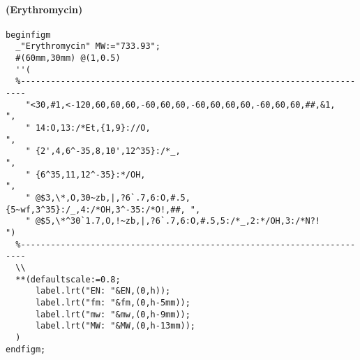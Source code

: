 \documentclass[a4paper]{article}
\begin{document}
\paragraph{(Erythromycin)}
\begin{verbatim}
beginfigm
  _"Erythromycin" MW:="733.93";
  #(60mm,30mm) @(1,0.5)
  ''(
  %-----------------------------------------------------------------------
    "<30,#1,<-120,60,60,60,-60,60,60,-60,60,60,60,-60,60,60,##,&1,        ",
    " 14:O,13:/*Et,{1,9}://O,                                             ",
    " {2',4,6^-35,8,10',12^35}:/*_,                                       ",
    " {6^35,11,12^-35}:*/OH,                                              ",
    " @$3,\*,O,30~zb,|,?6`.7,6:O,#.5,{5~wf,3^35}:/_,4:/*OH,3^-35:/*O!,##, ",
    " @$5,\*^30`1.7,O,!~zb,|,?6`.7,6:O,#.5,5:/*_,2:*/OH,3:/*N?!           ")
  %-----------------------------------------------------------------------
  \\
  **(defaultscale:=0.8;
      label.lrt("EN: "&EN,(0,h));
      label.lrt("fm: "&fm,(0,h-5mm));
      label.lrt("mw: "&mw,(0,h-9mm));
      label.lrt("MW: "&MW,(0,h-13mm));
  )
endfigm;
\end{verbatim}
\end{document}
